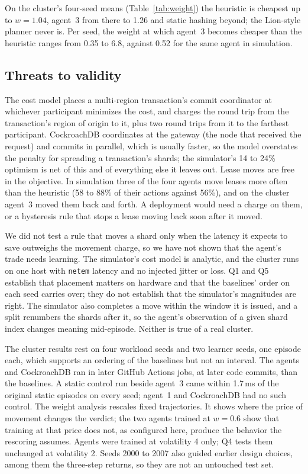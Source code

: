 On the cluster's four-seed means (Table~\ref{tab:weight}) the heuristic is
cheapest up to $w=1.04$, agent~3 from there to 1.26 and static hashing beyond; the Lion-style planner never
is. Per seed, the weight at which agent~3 becomes cheaper than the heuristic ranges from 0.35 to 6.8, against 0.52 for
the same agent in simulation.

\subsection{Threats to validity}

The cost model places a multi-region transaction's commit coordinator at whichever participant minimizes the cost, and charges the round trip from the transaction's region of origin to it, plus two round trips from it to the farthest participant. CockroachDB coordinates at the gateway (the node that received the request) and commits in parallel, which is usually faster,
so the model overstates the penalty for spreading a transaction's shards; the
simulator's 14 to 24\% optimism is net of this and of everything else it
leaves out. Lease moves are free in the objective. In simulation three of the four agents move leases
more often than the heuristic (58 to 88\% of their actions against 56\%), and on the cluster agent~3 moved them back and forth. A deployment
would need a charge on them, or a hysteresis rule that stops a lease moving back soon after it moved.

We did not test a rule that moves a shard only when the latency it expects to save
outweighs the movement charge, so we have not shown that the agent's trade needs learning.
The simulator's cost model is analytic, and the cluster runs on one host with
\texttt{netem} latency and no injected jitter or loss. Q1 and Q5 establish that placement
matters on hardware and that the baselines' order on each seed carries over; they do not establish that the
simulator's magnitudes are right. The simulator also completes a move within the window it is issued, and a split
renumbers the shards after it, so the agent's observation of a given shard
index changes meaning mid-episode. Neither is true of a real cluster.

The cluster results rest on four workload seeds and two learner seeds, one
episode each, which supports an ordering of the baselines but not an interval.
The agents and CockroachDB ran in later GitHub Actions jobs, at later code commits, than the baselines. A static control run beside agent~3 came within 1.7\,ms of the original static episodes on every seed; agent~1 and CockroachDB had no such control.
The weight analysis rescales fixed trajectories. It shows where the price of
movement changes the verdict; the two agents trained at $w=0.6$ show that
training at that price does not, as configured here, produce the behavior the rescoring assumes.
Agents were trained at volatility 4 only; Q4 tests them unchanged at
volatility 2. Seeds 2000 to 2007 also guided earlier design choices, among them the three-step
returns, so they are not an untouched test set.

